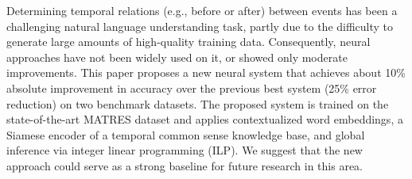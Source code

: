 Determining temporal relations (e.g., before or after) between events has been a challenging natural language understanding task, partly due to the difficulty to generate large amounts of high-quality training data. Consequently, neural approaches have not been widely used on it, or showed only moderate improvements. This paper proposes a new neural system that achieves about 10\% absolute improvement in accuracy over the previous best system (25\% error reduction) on two benchmark datasets. The proposed system is trained on the state-of-the-art MATRES dataset and applies contextualized word embeddings, a Siamese encoder of a temporal common sense knowledge base, and global inference via integer linear programming (ILP). We suggest that the new approach could serve as a strong baseline for future research in this area.
